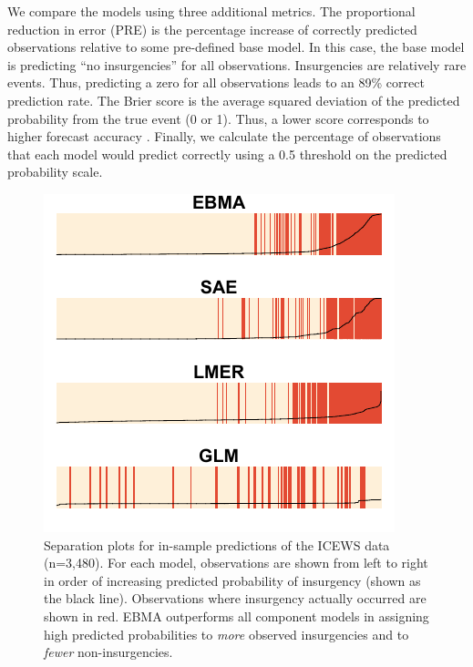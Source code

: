 \documentclass[12pt,fullpage]{article}
\begin{document}
We compare the models using three additional metrics.  The
proportional reduction in error (PRE) is the percentage increase of
correctly predicted observations relative to some pre-defined base
model. In this case, the base model is predicting ``no insurgencies''
for all observations.  Insurgencies are relatively rare events.  Thus,
predicting a zero for all observations leads to an 89\% correct
prediction rate. The Brier score is the average squared deviation of
the predicted probability from the true event (0 or 1).  Thus, a lower
score corresponds to higher forecast accuracy \citep{Brier:1950}.
Finally, we calculate the percentage of observations that each model
would predict correctly using a 0.5 threshold on the predicted
probability scale.
\begin{figure}
  \caption{\footnotesize Separation plots for in-sample predictions of
    the ICEWS data (n=3,480).  For each model, observations are shown
    from left to right in order of increasing predicted probability of
    insurgency (shown as the black line).  Observations where
    insurgency actually occurred are shown in red. EBMA outperforms
    all component models in assigning high predicted probabilities to
    \textit{more} observed insurgencies and to \textit{fewer}
    non-insurgencies.}
\label{InSam1sep}
\begin{center}
\includegraphics[]{Insamplenew.pdf}
\end{center}
\end{figure}
\end{document}

